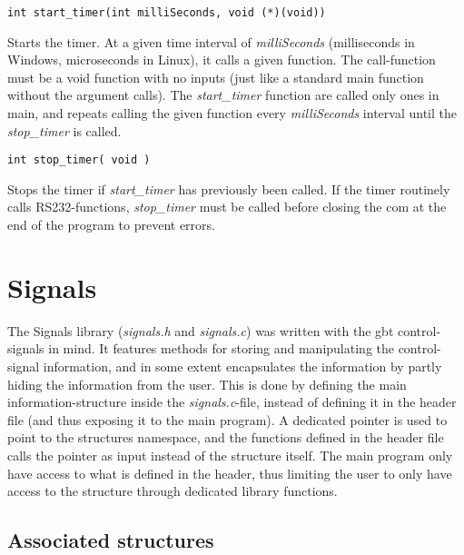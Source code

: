 \documentclass[main.tex]{subfiles}
\begin{document}

\begin{lstlisting}[frame=single] 
int start_timer(int milliSeconds, void (*)(void))
\end{lstlisting}
Starts the timer. At a given time interval of \textit{milliSeconds} (milliseconds in Windows, microseconds in Linux), it calls a given function. The call-function must be a void function with no inputs (just like a standard main function without the argument calls). The \textit{start\_timer} function are called only ones in main, and repeats calling the given function every \textit{milliSeconds} interval until the \textit{stop\_timer} is called.\\

\begin{lstlisting}[frame=single] 
int stop_timer( void )
\end{lstlisting}
Stops the timer if \textit{start\_timer} has previously been called. If the timer routinely calls RS232-functions, \textit{stop\_timer} must be called before closing the \gls{com} at the end of the program to prevent errors.

\section{Signals} \label{sec:signals}

The Signals library (\textit{signals.h} and \textit{signals.c}) was written with the \gls{gbt} control-signals in mind. It features methods for storing and manipulating the control-signal information, and in some extent encapsulates the information by partly hiding the information from the user. This is done by defining the main information-structure inside the \textit{signals.c}-file, instead of defining it in the header file (and thus exposing it to the main program). A dedicated pointer is used to point to the structures namespace, and the functions defined in the header file calls the pointer as input instead of the structure itself. The main program only have access to what is defined in the header, thus limiting the user to only have access to the structure through dedicated library functions.

\subsection{Associated structures}
\end{document}

